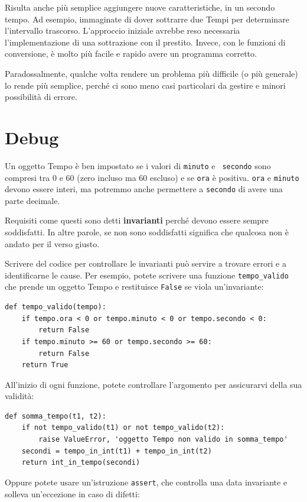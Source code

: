 \documentclass[10pt]{book}
\begin{document}
Risulta anche più semplice aggiungere nuove caratteristiche, in un secondo tempo. Ad esempio, immaginate di dover sottrarre due Tempi per determinare l'intervallo trascorso. L'approccio iniziale avrebbe reso necessaria l'implementazione di  una sottrazione con il prestito. Invece, con le funzioni di conversione, è molto più facile e rapido avere un programma corretto.

Paradossalmente, qualche volta rendere un problema più difficile (o più generale) lo rende più semplice, perché ci sono meno casi particolari da gestire e minori possibilità di errore.


\section{Debug}

Un oggetto Tempo è ben impostato se i valori di {\tt minuto} e {\tt
secondo} sono compresi tra 0 e 60 (zero incluso ma 60 escluso) e se 
{\tt ora} è positiva.  {\tt ora} e {\tt minuto} devono essere interi, ma potremmo anche permettere a {\tt secondo} di avere una parte decimale.

Requisiti come questi sono detti {\bf invarianti} perché devono essere sempre soddisfatti. In altre parole, se non sono soddisfatti significa che qualcosa non è andato per il verso giusto.

Scrivere del codice per controllare le invarianti può servire a trovare errori e a identificarne le cause. Per esempio, potete scrivere una funzione
 \verb"tempo_valido" che prende un oggetto Tempo e restituisce
{\tt False} se viola un'invariante:

\begin{verbatim}
def tempo_valido(tempo):
    if tempo.ora < 0 or tempo.minuto < 0 or tempo.secondo < 0:
        return False
    if tempo.minuto >= 60 or tempo.secondo >= 60:
        return False
    return True
\end{verbatim}
%
All'inizio di ogni funzione, potete controllare l'argomento per assicurarvi della sua validità:

\begin{verbatim}
def somma_tempo(t1, t2):
    if not tempo_valido(t1) or not tempo_valido(t2):
        raise ValueError, 'oggetto Tempo non valido in somma_tempo'
    secondi = tempo_in_int(t1) + tempo_in_int(t2)
    return int_in_tempo(secondi)
\end{verbatim}
%
Oppure potete usare un'istruzione {\tt assert}, che controlla una data invariante e solleva un'eccezione in caso di difetti:
\end{document}
